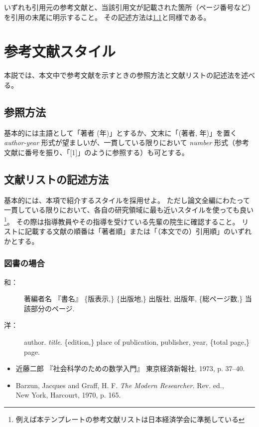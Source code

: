 			\noindent
			いずれも引用元の参考文献と、当該引用文が記載された箇所（ページ番号など）を引用の末尾に明示すること。
			その記述方法は\cref{sub:ref_style}と同様である。


	\section{参考文献スタイル}
		\label{sec:bib_style}

		本説では、本文中で参考文献を示すときの参照方法と文献リストの記述法を述べる。

		\subsection{参照方法}
			\label{sub:ref_style}

			基本的には主語として「著者 (年)」とするか、文末に「(著者, 年)」を置く \emph{author-year} 形式が望ましいが、一貫している限りにおいて \emph{number} 形式（参考文献に番号を振り、「[1]」のように参照する）も可とする。

		\subsection{文献リストの記述方法}
			\label{sub:ref_list_sylte}

			基本的には、本項で紹介するスタイルを採用せよ。
			ただし論文全編にわたって一貫している限りにおいて、各自の研究領域に最も近いスタイルを使っても良い
			\footnote{例えば本テンプレートの参考文献リストは日本経済学会に準拠している}。
			その際は指導教員やその指導を受けている先輩の院生に確認すること。
			リストに記載する文献の順番は「著者順」または「（本文での）引用順」のいずれかとする。


		\subsubsection{図書の場合}

			\begin{description}
				\item[和：] 著編者名 『書名』 \{版表示,\} \{出版地,\} 出版社, 出版年, \{総ページ数,\} 当該部分のページ.
				\item[洋：] author. \textit{title}. \{edition,\} place of publication, publisher, year, \{total page,\} page.
			\end{description}

			\begin{screen} \begin{itemize}
				\item 近藤二郎 『社会科学のための数学入門』 東京経済新報社, 1973,
				p. 37--40.

				\item Barzun, Jacques and Graff, H. F. \textit{The Modern Researcher.}
				Rev. ed., \\New York, Harcourt, 1970, p. 165.
			\end{itemize} \end{screen}


